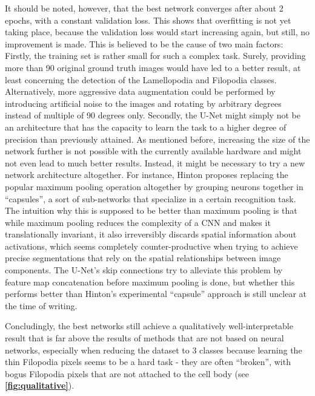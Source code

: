 It should be noted, however, that the best network converges after about 2 epochs, with a constant validation loss. This shows that overfitting is not yet taking place, because the validation loss would start increasing again, but still, no improvement is made. This is believed to be the cause of two main factors: Firstly, the training set is rather small for such a complex task. Surely, providing more than 90 original ground truth images would have led to a better result, at least concerning the detection of the Lamellopodia and Filopodia classes. Alternatively, more aggressive data augmentation could be performed by introducing artificial noise to the images and rotating by arbitrary degrees instead of multiple of 90 degrees only. Secondly, the U-Net might simply not be an architecture that has the capacity to learn the task to a higher degree of precision than previously attained. As mentioned before, increasing the size of the network further is not possible with the currently available hardware and might not even lead to much better results. Instead, it might be necessary to try a new network architecture altogether. For instance, Hinton \cite{capsules} proposes replacing the popular maximum pooling operation altogether by grouping neurons together in ``capsules'', a sort of sub-networks that specialize in a certain recognition task. The intuition why this is supposed to be better than maximum pooling is that while maximum pooling reduces the complexity of a CNN and makes it translationally invariant, it also irreversibly discards spatial information about activations, which seems completely counter-productive when trying to achieve precise segmentations that rely on the spatial relationships between image components. The U-Net's skip connections try to alleviate this problem by feature map concatenation before maximum pooling is done, but whether this performs better than Hinton's experimental ``capsule'' approach is still unclear at the time of writing.

Concludingly, the best networks still achieve a qualitatively well-interpretable result that is far above the results of methods that are not based on neural networks, especially when reducing the dataset to 3 classes because learning the thin Filopodia pixels seems to be a hard task - they are often ``broken'', with bogus Filopodia pixels that are not attached to the cell body (see \textbf{\ref{fig:qualitative}}).